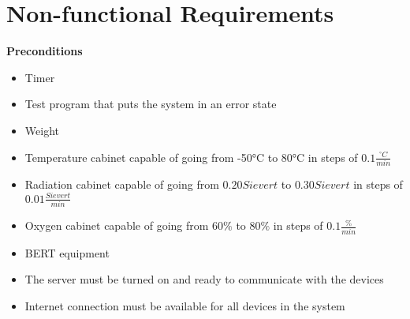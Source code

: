 \section{Non-functional Requirements}

\textbf{Preconditions}
\begin{itemize}
\item Timer
\item Test program that puts the system in an error state
\item Weight
\item Temperature cabinet capable of going from -50°C to 80°C in steps of $0.1\frac{^{\circ}C}{min}$
\item Radiation cabinet capable of going from $0.20 Sievert$ to $0.30 Sievert$ in steps of $0.01\frac{Sievert}{min}$
\item Oxygen cabinet capable of going from $60 \%$ to $80 \%$ in steps of $0.1\frac{\%}{min}$
\item BERT equipment
\item The server must be turned on and ready to communicate with the devices
\item Internet connection must be available for all devices in the system
\end{itemize}
~\


